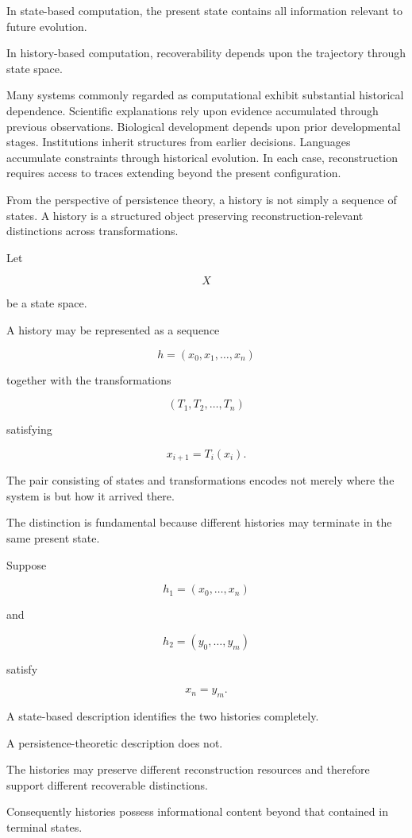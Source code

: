 \documentclass[12pt,oneside]{article}
\theoremstyle{definition}
\begin{document}
In state-based computation, the present state contains all information relevant to future evolution.

In history-based computation, recoverability depends upon the trajectory through state space.

Many systems commonly regarded as computational exhibit substantial historical dependence. Scientific explanations rely upon evidence accumulated through previous observations. Biological development depends upon prior developmental stages. Institutions inherit structures from earlier decisions. Languages accumulate constraints through historical evolution. In each case, reconstruction requires access to traces extending beyond the present configuration.

From the perspective of persistence theory, a history is not simply a sequence of states. A history is a structured object preserving reconstruction-relevant distinctions across transformations.

Let

\[
X
\]

be a state space.

A history may be represented as a sequence

\[
h
=
(x_0,x_1,\ldots,x_n)
\]

together with the transformations

\[
(T_1,T_2,\ldots,T_n)
\]

satisfying

\[
x_{i+1}
=
T_i(x_i).
\]

The pair consisting of states and transformations encodes not merely where the system is but how it arrived there.

The distinction is fundamental because different histories may terminate in the same present state.

Suppose

\[
h_1
=
(x_0,\ldots,x_n)
\]

and

\[
h_2
=
(y_0,\ldots,y_m)
\]

satisfy

\[
x_n=y_m.
\]

A state-based description identifies the two histories completely.

A persistence-theoretic description does not.

The histories may preserve different reconstruction resources and therefore support different recoverable distinctions.

Consequently histories possess informational content beyond that contained in terminal states.
\end{document}
